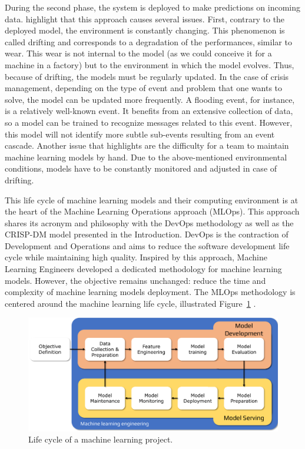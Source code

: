 During the second phase, the system is deployed to make predictions on incoming data.
\textcite[Chapter~1]{treveilIntroducingMLOps2020} highlight that this approach causes several issues.
First, contrary to the deployed model, the environment is constantly changing.
This phenomenon is called drifting and corresponds to a degradation of the performances, similar to wear.
This wear is not internal to the model (as we could conceive it for a machine in a factory) but to the environment in which the model evolves.
Thus, because of drifting, the models must be regularly updated.
In the case of crisis management, depending on the type of event and problem that one wants to solve, the model can be updated more frequently.
A flooding event, for instance, is a relatively well-known event.
It benefits from an extensive collection of data, so a model can be trained to recognize messages related to this event.
However, this model will not identify more subtle sub-events resulting from an event cascade.
Another issue that \citeauthor{treveilIntroducingMLOps2020} highlights are the difficulty for a team to maintain machine learning models by hand.
Due to the above-mentioned environmental conditions, models have to be constantly monitored and adjusted in case of drifting.

This life cycle of machine learning models and their computing environment is at the heart of the Machine Learning Operations approach (MLOps).
This approach shares its acronym and philosophy with the DevOps methodology as well as the CRISP-DM model presented in the Introduction.
DevOps is the contraction of Development and Operations and aims to reduce the software development life cycle while maintaining high quality.
Inspired by this approach, Machine Learning Engineers developed a dedicated methodology for machine learning models.
However, the objective remains unchanged: reduce the time and complexity of machine learning models deployment.
The MLOps methodology is centered around the machine learning life cycle, illustrated Figure~\ref{system:ml-life-cycle} \parencite{treveilIntroducingMLOps2020,burkovMachineLearningEngineering2020}.

\begin{figure}[htb]
    \centering
    \includegraphics[width=\textwidth]{figures/chap-5/machine-learning-life-cycle.pdf}
    \caption{Life cycle of a machine learning project.}
    \label{system:ml-life-cycle}
\end{figure}


